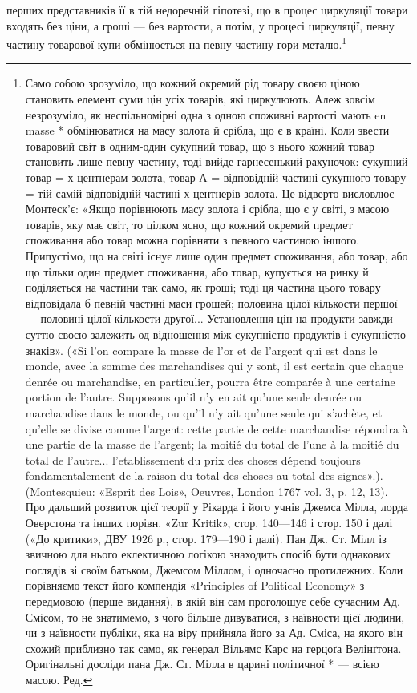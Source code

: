 перших представників її в тій недоречній гіпотезі, що в процес
циркуляції товари входять без ціни, а гроші — без вартости, а
потім, у процесі циркуляції, певну частину товарової купи обмінюється
на певну частину гори металю.\footnote{
Само собою зрозуміло, що кожний окремий рід товару своєю ціною
становить елемент суми цін усіх товарів, які циркулюють. Алеж зовсім
незрозуміло, як неспільномірні одна з одною споживні вартості мають
en masse * обмінюватися на масу золота й срібла, що є в країні. Коли
звести товаровий світ в одним-один сукупний товар, що з нього кожний
товар становить лише певну частину, тоді вийде гарнесенький рахуночок:
сукупний товар = х центнерам золота, товар А = відповідній частині
сукупного товару = тій самій відповідній частині х центнерів золота. Це
відверто висловлює Монтеск’є: «Якщо порівнюють масу золота і срібла,
що є у світі, з масою товарів, яку має світ, то цілком ясно, що кожний
окремий предмет споживання або товар можна порівняти з певного частиною
іншого. Припустімо, що на світі існує лише один предмет споживання,
або товар, або що тільки один предмет споживання, або товар, купується
на ринку й поділяється на частини так само, як гроші; тоді ця частина
цього товару відповідала б певній частині маси грошей; половина цілої
кількости першої — половині цілої кількости другої... Установлення цін
на продукти завжди суттю своєю залежить од відношення між сукупністю
продуктів і сукупністю знаків». («Si l’on compare la masse de l’or et
de l’argent qui est dans le monde, avec la somme des marchandises qui y
sont, il est certain que chaque denrée ou marchandise, en particulier, pourra
être comparée à une certaine portion de l’autre. Supposons qu’il n’y en ait
qu’une seule denrée ou marchandise dans le monde, ou qu’il n’y ait qu’une
seule qui s’achète, et qu’elle se divise comme l’argent: cette partie de cette marchandise
répondra à une partie de la masse de l’argent; la moitié du total
de l’une à la moitié du total de l’autre... l’etablissement du prix des choses
dépend toujours fondamentalement de la raison du total des choses au
total des signes».). (Montesquieu: «Esprit des Lois», Oeuvres, London
1767 vol. 3, p. 12, 13). Про дальший розвиток цієї теорії у Рікарда
і його учнів Джемса Мілла, лорда Оверстона та інших порівн. «Zur
Kritik», стор. 140—146 і стор. 150 і далі («До критики», ДВУ 1926 р.,
стор. 179—190 і далі). Пан Дж. Ст. Мілл із звичною для нього еклектичною
логікою знаходить спосіб бути однакових поглядів зі своїм
батьком, Джемсом Міллом, і одночасно протилежних. Коли порівняємо
текст його компендія «Principles of Political Economy» з передмовою
(перше видання), в якій він сам проголошує себе сучасним Ад. Смісом,
то не знатимемо, з чого більше дивуватися, з наївности цієї людини, чи
з наївности публіки, яка на віру прийняла його за Ад. Сміса, на якого
він схожий приблизно так само, як генерал Вільямс Карс на герцоґа
Велінґтона. Оригінальні досліди пана Дж. Ст. Мілла в царині політичної
* — всією масою. Ред.
}

